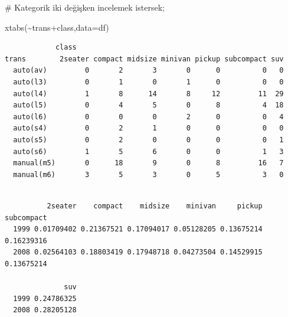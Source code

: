 \documentclass[
  letterpaper,
  DIV=11,
  numbers=noendperiod]{scrreprt}
\newenvironment{Shaded}{\begin{snugshade}}{\end{snugshade}}
\newcommand{\AttributeTok}[1]{\textcolor[rgb]{0.40,0.45,0.13}{#1}}
\newcommand{\CommentTok}[1]{\textcolor[rgb]{0.37,0.37,0.37}{#1}}
\newcommand{\DecValTok}[1]{\textcolor[rgb]{0.68,0.00,0.00}{#1}}
\newcommand{\FunctionTok}[1]{\textcolor[rgb]{0.28,0.35,0.67}{#1}}
\newcommand{\NormalTok}[1]{\textcolor[rgb]{0.00,0.23,0.31}{#1}}
\newcommand{\SpecialCharTok}[1]{\textcolor[rgb]{0.37,0.37,0.37}{#1}}
\begin{document}
\begin{Shaded}
\begin{Highlighting}[]
\CommentTok{\# Kategorik iki değişken incelemek istersek;}

\FunctionTok{xtabs}\NormalTok{(}\SpecialCharTok{\textasciitilde{}}\NormalTok{trans}\SpecialCharTok{+}\NormalTok{class,}\AttributeTok{data=}\NormalTok{df)}
\end{Highlighting}
\end{Shaded}

\begin{verbatim}
            class
trans        2seater compact midsize minivan pickup subcompact suv
  auto(av)         0       2       3       0      0          0   0
  auto(l3)         0       1       0       1      0          0   0
  auto(l4)         1       8      14       8     12         11  29
  auto(l5)         0       4       5       0      8          4  18
  auto(l6)         0       0       0       2      0          0   4
  auto(s4)         0       2       1       0      0          0   0
  auto(s5)         0       2       0       0      0          0   1
  auto(s6)         1       5       6       0      0          1   3
  manual(m5)       0      18       9       0      8         16   7
  manual(m6)       3       5       3       0      5          3   0
\end{verbatim}

\begin{Shaded}
\end{Shaded}

\begin{verbatim}
      
          2seater    compact    midsize    minivan     pickup subcompact
  1999 0.01709402 0.21367521 0.17094017 0.05128205 0.13675214 0.16239316
  2008 0.02564103 0.18803419 0.17948718 0.04273504 0.14529915 0.13675214
      
              suv
  1999 0.24786325
  2008 0.28205128
\end{verbatim}

\begin{Shaded}
\end{Shaded}
\end{document}
